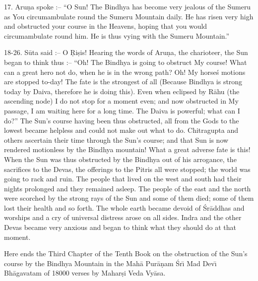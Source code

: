 17. Aru\d{n}a spoke :-- ``O Sun! The Bindhya has become very jealous of the Sumeru as You circumambulate round the Sumeru Mountain daily. He has risen very high and obstructed your course in the Heavens, hoping that you would circumambulate round him. He is thus vying with the Sumeru Mountain.''

18-26. S\=uta said :-- O \d{R}i\d{s}is! Hearing the words of Aru\d{n}a, the charioteer, the Sun began to think thus :-- ``Oh! The Bindhya is going to obstruct My course! What can a great hero not do, when he is in the wrong path? Oh! My horse\'s motions are stopped to-day! The fate is the strongest of all (Because Bindhya is strong today by Daiva, therefore he is doing this). Even when eclipsed by R\=ahu (the ascending node) I do not stop for a moment even; and now obstructed in My passage, I am waiting here for a long time. The Daiva is powerful; what can I do?'' The Sun's course having been thus obstructed, all from the Gods to the lowest became helpless and could not make out what to do. Chitragupta and others ascertain their time through the Sun's course; and that Sun is now rendered motionless by the Bindhya mountain! What a great adverse fate is this! When the Sun was thus obstructed by the Bindhya out of his arrogance, the sacrifices to the Devas, the offerings to the Pitris all were stopped; the world was going to rack and ruin. The people that lived on the west and south had their nights prolonged and they remained asleep. The people of the east and the north were scorched by the strong rays of the Sun and some of them died; some of them lost their health and so forth. The whole earth became devoid of \'Sr\=addhas and worships and a cry of universal distress arose on all sides. Indra and the other Devas became very anxious and began to think what they should do at that moment.

Here ends the Third Chapter of the Tenth Book on the obstruction of the Sun's course by the Bindhya Mountain in the Mah\=a Pur\=a\d{n}am \'Sr\={\i} Mad Dev\={\i} Bh\=agavatam of 18000 verses by Mahar\d{s}i Veda Vy\=asa.



